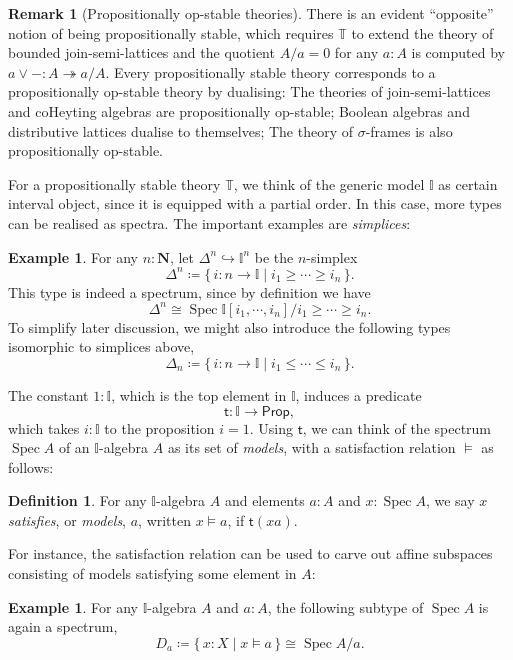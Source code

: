 \documentclass[a4paper,12pt]{amsart}
\theoremstyle{definition}
\newtheorem{example}[theorem]{Example}
\newtheorem{definition}[theorem]{Definition}
\newtheorem{remark}[theorem]{Remark}
\newcommand{\mb}[1]{\mathbf{#1}}
\newcommand{\mbb}[1]{\mathbb{#1}}
\newcommand{\T}{\mbb T}
\newcommand{\I}{\mbb I}
\newcommand{\ms}[1]{\mathsf{#1}}
\newcommand{\scomp}[2]{\{\,#1\mid#2\,\}}
\newcommand{\surj}{\twoheadrightarrow}
\newcommand{\hook}{\hookrightarrow}
\newcommand{\N}{\mb N}
\newcommand{\pp}{\ms{Prop}}
\newcommand{\spec}{\operatorname{Spec}}
\begin{document}
\begin{remark}[Propositionally op-stable theories]\label{rem:opprop}
  There is an evident ``opposite'' notion of being propositionally stable, which requires $\T$ to extend the theory of bounded join-semi-lattices and the quotient $A/a = 0$ for any $a:A$ is computed by $a \vee - : A \surj a/A$. Every propositionally stable theory corresponds to a propositionally op-stable theory by dualising: The theories of join-semi-lattices and coHeyting algebras are propositionally op-stable; Boolean algebras and distributive lattices dualise to themselves; The theory of $\sigma$-frames is also propositionally op-stable.
\end{remark}

For a propositionally stable theory $\T$, we think of the generic model $\I$ as certain interval object, since it is equipped with a partial order. In this case, more types can be realised as spectra. The important examples are \emph{simplices}:

\begin{example}\label{exm:simplicesaffine}
  For any $n : \N$, let $\Delta^n \hook \I^n$ be the $n$-simplex
  \[ \Delta^n \coloneq \scomp{i \colon n \to \I}{i_1 \ge \cdots \ge i_n}. \]
  This type is indeed a spectrum, since by definition we have
  \[ \Delta^n \cong \spec\I[i_1,\cdots,i_n]/i_1\ge\cdots\ge i_n. \]
  To simplify later discussion, we might also introduce the following types isomorphic to simplices above,
  \[ \Delta_n \coloneq \scomp{i \colon n \to \I}{i_1 \le \cdots \le i_n}. \]
\end{example}

The constant $1 : \I$, which is the top element in $\I$, induces a predicate
\[ \ms t \colon \I \to \pp, \]
which takes $i : \I$ to the proposition $i = 1$. Using $\ms t$, we can think of the spectrum $\spec A$ of an $\I$-algebra $A$ as its set of \emph{models}, with a satisfaction relation $\models$ as follows:

\begin{definition}
  For any $\I$-algebra $A$ and elements $a:A$ and $x:\spec A$, we say $x$ \emph{satisfies}, or \emph{models}, $a$, written $x \models a$, if $\ms t(xa)$.
\end{definition}

For instance, the satisfaction relation can be used to carve out affine subspaces consisting of models satisfying some element in $A$:

\begin{example}
  For any $\I$-algebra $A$ and $a:A$, the following subtype of $\spec A$ is again a spectrum,
  \[ D_a \coloneq \scomp{x : X}{x \models a} \cong \spec A/a. \]
\end{example}
\end{document}

